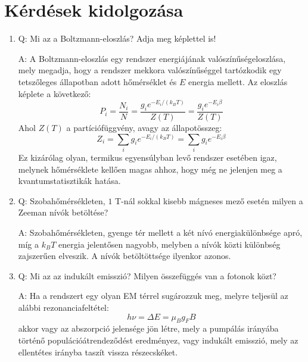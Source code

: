 \section{Kérdések kidolgozása}
\begin{enumerate}
    \item Q: Mi az a Boltzmann-eloszlás? Adja meg képlettel is!
    \begin{displayquote}
        A: A Boltzmann-eloszlás egy rendszer energiájának valószínűségeloszlása, mely megadja, hogy a rendszer mekkora valószínűséggel tartózkodik egy tetszőleges állapotban adott hőmérséklet és $E$ energia mellett. Az eloszlás képlete a következő:
        \begin{equation}
        P_{i}
        =
        \frac{N_{i}}{N}
        =
        \frac{g_{i} e^{-E_{i} / \left( k_{B} T \right)}}{Z \left( T \right)}
        =
        \frac{g_{i} e^{-E_{i} \beta}}{Z \left( T \right)}
        \end{equation}
Ahol $Z \left( T \right)$ a partíciófüggvény, avagy az állapotösszeg:
		\begin{equation}
		Z_{i}
		=
		\sum_{i} g_{i} e^{-E_{i} / \left( k_{B} T \right)}
		=
		\sum_{i} g_{i} e^{-E_{i} \beta}
		\end{equation}	
Ez kizárólag olyan, termikus egyensúlyban levő rendszer esetében igaz, melynek hőmérséklete kellően magas ahhoz, hogy még ne jelenjen meg a kvantumstatisztikák hatása. 
    \end{displayquote}
	
    \item Q: Szobahőmérsékleten, $1$ T-nál sokkal kisebb mágneses mező esetén milyen a Zeeman nívók betöltése?
    \begin{displayquote}
    	A: Szobahőmérsékleten, gyenge tér mellett a két nívó energiakülönbsége apró, míg a $k_{B}T$ energia jelentősen nagyobb, melyben a nívók közti különbség zajszerűen elveszik. A nívók betöltöttsége ilyenkor azonos.
    \end{displayquote}
    
    \item Q: Mi az az indukált emisszió? Milyen összefüggés van a fotonok közt?
    \begin{displayquote}
    	A: Ha a rendszert egy olyan EM térrel sugározzuk meg, melyre teljesül az alábbi rezonanciafeltétel:
    		\begin{equation}
    		h\nu
    		=
    		\Delta E
    		=
    		\mu_{B} g_{F} B
    		\end{equation}
akkor vagy az abszorpció jelensége jön létre, mely a pumpálás irányába történő populációátrendeződést eredményez, vagy indukált emisszió, mely az ellentétes irányba taszít vissza részecskéket.
    \end{displayquote}
    

\end{enumerate}
